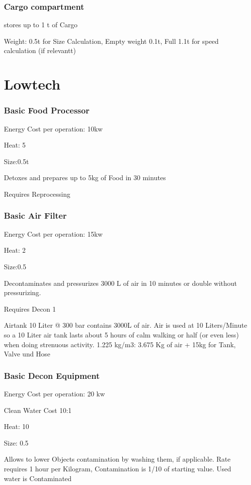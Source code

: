 \subsubsection{Cargo compartment}\label{subsubsec:cargo-compartment}
stores up to 1 t of Cargo\par
Weight: 0.5t for Size Calculation, Empty weight 0.1t, Full 1.1t for speed calculation (if relevantt)
\par
\section{Lowtech}\label{sec:lowtech}
\subsubsection{Basic Food Processor}
Energy Cost per operation: 10kw \par
Heat: 5 \par
Size:0.5t\par
Detoxes and prepares up to 5kg of Food in 30 minutes \par
Requires Reprocessing\par

\subsubsection{Basic Air Filter}
Energy Cost per operation: 15kw \par
Heat: 2\par
Size:0.5\par
Decontaminates and pressurizes 3000 L of air in  10 minutes or double without pressurizing. \par
Requires Decon 1\par
Airtank 10 Liter @ 300 bar contains 3000L of air.
Air is used at 10 Liters/Minute so a 10 Liter air tank lasts about 5 hours of calm
walking or half (or even less) when doing strenuous activity.
1.225 kg/m3: 3.675 Kg of air
+ 15kg for Tank, Valve und Hose
\par
\subsubsection{Basic Decon Equipment}
Energy Cost per operation: 20 kw \par
Clean Water Cost 10:1\par
Heat: 10 \par
Size: 0.5\par
Allows to lower Objects contamination by washing them, if applicable.
Rate requires 1 hour per Kilogram, Contamination is 1/10 of starting value.
Used water is Contaminated\par

